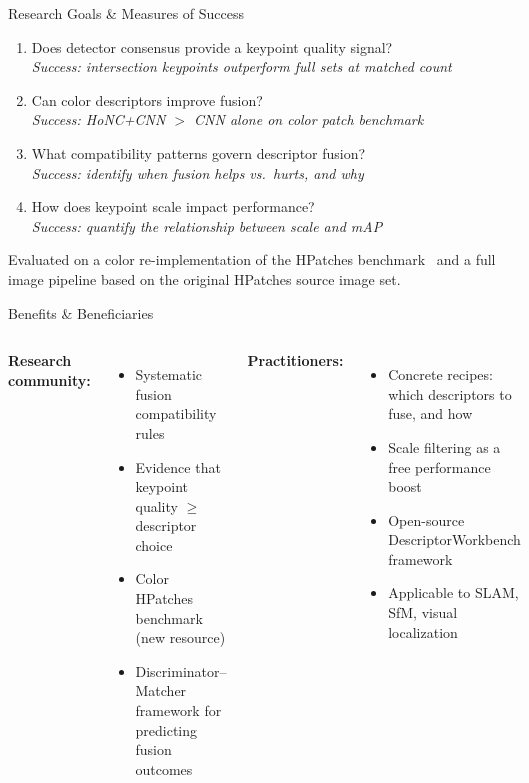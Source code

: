 \documentclass[aspectratio=169, 12pt]{beamer}
\begin{document}
\begin{frame}{Research Goals \& Measures of Success}
  \begin{enumerate}
    \item[\textbf{RQ1}] Does detector consensus provide a keypoint quality signal?\\
          {\small \textit{Success: intersection keypoints outperform full sets at matched count}}
    \item[\textbf{RQ2}] Can color descriptors improve fusion?\\
          {\small \textit{Success: HoNC+CNN $>$ CNN alone on color patch benchmark}}
    \item[\textbf{RQ3}] What compatibility patterns govern descriptor fusion?\\
          {\small \textit{Success: identify when fusion helps vs.\ hurts, and why}}
    \item[\textbf{RQ4}] How does keypoint scale impact performance?\\
          {\small \textit{Success: quantify the relationship between scale and mAP}}
  \end{enumerate}
  \vfill
  {\small Evaluated on a color re-implementation of the HPatches benchmark~\cite{balntas2017hpatches} and a full image pipeline based on the original HPatches source image set.}
\end{frame}

\begin{frame}{Benefits \& Beneficiaries}
  \begin{columns}[T]
    \textbf{Research community:}
    \begin{itemize}
      \item Systematic fusion compatibility rules
      \item Evidence that keypoint quality $\geq$ descriptor choice
      \item Color HPatches benchmark (new resource)
      \item Discriminator--Matcher framework for predicting fusion outcomes
    \end{itemize}
    \textbf{Practitioners:}
    \begin{itemize}
      \item Concrete recipes: which descriptors to fuse, and how
      \item Scale filtering as a free performance boost
      \item Open-source DescriptorWorkbench framework
      \item Applicable to SLAM, SfM, visual localization
    \end{itemize}
  \end{columns}
\end{frame}
\end{document}
